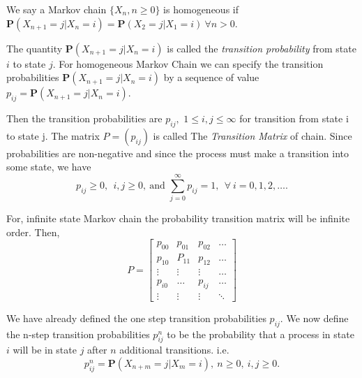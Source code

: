 \begin{definition}
    We say a Markov chain $ \{ X_n,n\ge 0 \} $ is homogeneous if $ \mathbf{P}(X_{n+1}=j|X_n=i)=\mathbf{P}(X_2=j|X_1=i) \ \forall n>0 $. 
\end{definition}

The quantity $ \mathbf{P}(X_{n+1}=j|X_n=i) $ is called the \textit{transition probability} from state $i$ to state $j$. For homogeneous Markov Chain 
we can specify the transition probabilities $ \mathbf{P}(X_{n+1}=j|X_{n}=i) $ by a sequence of value $ p_{ij} = \mathbf{P}(X_{n+1}=j|X_{n}=i) $.

Then the transition probabilities are $ p_{ij}, $ 
$ 1\le i,j \le \infty $ for transition from state i to state j. The matrix  $ P = (p_{ij}) $ is called The
\textit{Transition Matrix} of chain. Since probabilities are non-negative and since the process must make a transition into some state, we have
\[
    p_{ij}\ge 0,\ \ i,j\ge 0,\ \text{and } \sum_{j=0}^{\infty}p_{ij} = 1,\ \  \forall\ i=0,1,2,\ldots.
\]

For, infinite state Markov chain the probability transition matrix will be infinite order. 
Then,
\[
    P = 
    \begin{bmatrix}
        p_{00} & p_{01} & p_{02} & \ldots \\
        p_{10} & P_{11} & p_{12} & \ldots \\
        \vdots & \vdots & \vdots & \ldots \\ 
        p_{i0} & \ldots & p_{ij} & \ldots \\
        \vdots & \vdots & \vdots & \ddots 
    \end{bmatrix}
\]

We have already defined the one step transition probabilities $ p_{ij} $. We now define the n-step transition probabilities $ p_{ij}^{n} $ 
to be the probability that a process in state $i$ will be in state $j$ after $n$ additional transitions. i.e.
\[
    p^{n}_{ij}=\mathbf{P}(X_{n+m}=j|X_{m}=i), \ n\ge 0, \ i,j\ge 0.
\]


